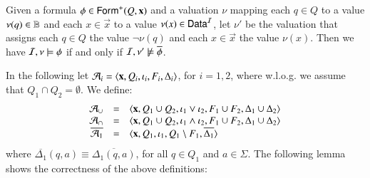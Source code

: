 \documentclass[10pt,conference,letterpaper,twocolumn]{IEEEtran}
\begin{document}
\begin{proposition}\label{prop:overline}
  Given a formula $\phi \in \mathsf{Form}^+(Q,\mathbf x)$ and a valuation $\nu$
  mapping each $q \in Q$ to a value $\nu(q) \in \mathbb{B}$ and each $x \in
  \vec{x}$ to a value $\nu(x) \in \mathsf{Data}^{\mathcal{I}}$, let $\nu'$ be the
  valuation that assigns each $q \in Q$ the value $\neg\nu(q)$ and
  each $x \in \vec{x}$ the value $\nu(x)$. Then we have 
  $\mathcal{I},\nu \models \phi$ if and only if $\mathcal{I},\nu' \not\models \overline{\phi}$. 
\end{proposition}

In the following let $\mathcal{A}_i =
\left\langle \mathbf x,Q_i,\iota_i,F_i,\Delta_i \right\rangle$, for $i=1,2$, where
w.l.o.g. we assume that $Q_1 \cap Q_2 = \emptyset$. We define: 
\[\begin{array}{rcl}
\mathcal{A}_\cup & = & \left\langle \mathbf x,Q_1\cup Q_2,\iota_1 \vee \iota_2,F_1\cup F_2,\Delta_1\cup\Delta_2 \right\rangle \\ 
\mathcal{A}_\cap & = & \left\langle \mathbf x,Q_1\cup Q_2,\iota_1 \wedge \iota_2, F_1\cup F_2, \Delta_1\cup\Delta_2 \right\rangle \\ 
\overline{\mathcal{A}_1} & = & \langle \mathbf x,Q_1,\iota_1,Q_1\setminus F_1,\overline{\Delta_1} \rangle
\end{array}\] 
where $\overline{\Delta_1}(q,a) \equiv \overline{\Delta_1(q,a)}$, for
all $q \in Q_1$ and $a \in \Sigma$. The following lemma shows the
correctness of the above definitions:
\end{document}
